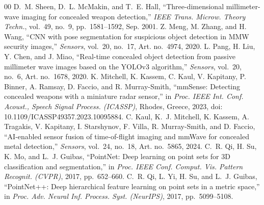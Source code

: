\documentclass[conference]{IEEEtran}
\begin{document}
\begin{thebibliography}{00}
 D.~M. Sheen, D.~L. McMakin, and T.~E. Hall, ``Three-dimensional millimeter-wave imaging for concealed weapon detection,'' \textit{IEEE Trans. Microw. Theory Techn.}, vol.~49, no.~9, pp.~1581--1592, Sep. 2001.
 Z. Meng, M. Zhang, and H. Wang, ``CNN with pose segmentation for suspicious object detection in MMW security images,'' \textit{Sensors}, vol.~20, no.~17, Art. no.~4974, 2020.
 L. Pang, H. Liu, Y. Chen, and J. Miao, ``Real-time concealed object detection from passive millimeter wave images based on the YOLOv3 algorithm,'' \textit{Sensors}, vol.~20, no.~6, Art. no.~1678, 2020.
 K. Mitchell, K. Kassem, C. Kaul, V. Kapitany, P. Binner, A. Ramsay, D. Faccio, and R. Murray-Smith, ``mmSense: Detecting concealed weapons with a miniature radar sensor,'' in \textit{Proc. IEEE Int. Conf. Acoust., Speech Signal Process. (ICASSP)}, Rhodes, Greece, 2023, doi: 10.1109/ICASSP49357.2023.10095884.
 C. Kaul, K.~J. Mitchell, K. Kassem, A. Tragakis, V. Kapitany, I. Starshynov, F. Villa, R. Murray-Smith, and D. Faccio, ``AI-enabled sensor fusion of time-of-flight imaging and mmWave for concealed metal detection,'' \textit{Sensors}, vol.~24, no.~18, Art. no.~5865, 2024.
 C.~R. Qi, H. Su, K. Mo, and L.~J. Guibas, ``PointNet: Deep learning on point sets for 3D classification and segmentation,'' in \textit{Proc. IEEE Conf. Comput. Vis. Pattern Recognit. (CVPR)}, 2017, pp.~652--660.
 C.~R. Qi, L. Yi, H. Su, and L.~J. Guibas, ``PointNet++: Deep hierarchical feature learning on point sets in a metric space,'' in \textit{Proc. Adv. Neural Inf. Process. Syst. (NeurIPS)}, 2017, pp.~5099--5108.
\end{thebibliography}
\end{document}
